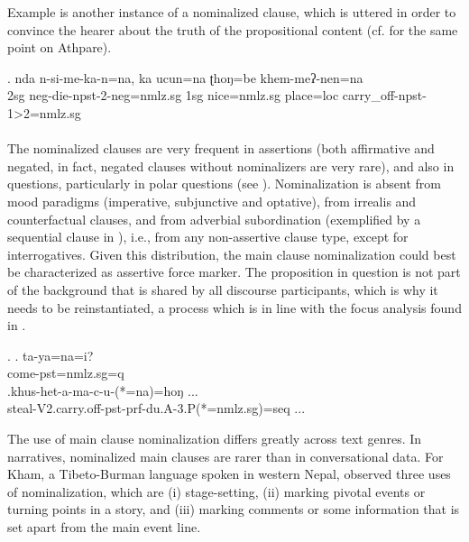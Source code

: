 Example \Next is another instance of a nominalized clause, which is uttered in order to convince the hearer about the truth of the propositional content (cf. \citet{Ebert1997A-grammar} for the same point on Athpare). 


\exg. nda n-si-me-ka-n=na,  ka ucun=na  ʈhoŋ=be khem-meʔ-nen=na\\
		{\sc 2sg} {\sc neg}-die-{\sc npst-2-neg=nmlz.sg} {\sc 1sg}  nice{\sc =nmlz.sg} place{\sc =loc} carry\_off-{\sc npst-1>2=nmlz.sg} 	\\
	 \\


The nominalized clauses are very frequent in assertions (both affirmative and negated, in fact, negated clauses without nominalizers are very rare), and also in  questions, particularly in polar questions (see \Next[a]). Nominalization is absent from  mood  paradigms (imperative, subjunctive and optative), from irrealis and counterfactual clauses, and from adverbial subordination (exemplified by a sequential clause in \Next[b]), i.e., from any non-assertive clause type, except for interrogatives. Given this distribution, the main clause nominalization could best be characterized as assertive force marker. The proposition in question is not part of the background that is shared by all discourse participants, which is why it needs to be reinstantiated, a process which is in line with the focus analysis found in \citet{Bickel1999Nominalization}. 


\ex. \ag. ta-ya=na=i?\\
		come{\sc [3sg]-pst=nmlz.sg=q}	\\
 	\bg.khus-het-a-ma-c-u-(*=na)=hoŋ ...\\
	steal-{\sc V2.carry.off-pst-prf-du.A-3.P(*=nmlz.sg)=seq} ...\\
	 


The use of main clause nominalization differs greatly across text genres. In narratives, nominalized main clauses are rarer than in conversational data. For Kham, a Tibeto-Burman language spoken in western Nepal, \citet{Watters2002A-grammar} observed three uses of nominalization, which are (i) stage-setting, (ii) marking pivotal events or turning points in a story, and (iii) marking comments or some information that is set apart from the main event line. 

